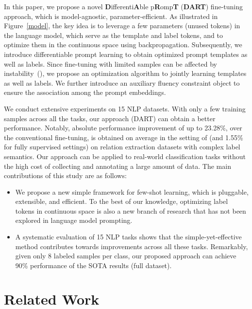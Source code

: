 \documentclass{article} \usepackage{iclr2022_conference,times}
\begin{document}
In this paper, we propose a novel \textbf{D}ifferenti\textbf{A}ble p\textbf{R}omp\textbf{T} (\textbf{DART}) fine-tuning approach, which is model-agnostic, parameter-efficient.
As illustrated in Figure~\ref{model}, the key idea is to leverage a few parameters (unused tokens) in the language model, which serve as the template and label tokens, and to optimize them in the continuous space using backpropagation. 
Subsequently, we introduce differentiable prompt learning to obtain optimized prompt templates as well as labels. 
Since fine-tuning with limited samples can be affected by instability~(\cite{DBLP:journals/corr/abs-2002-06305,zhang2021revisiting}), we propose an optimization algorithm to jointly learning templates as well as labels. 
We further introduce an auxiliary fluency constraint object to ensure the association among the prompt embeddings.

We conduct extensive experiments on 15 NLP datasets.
With only a few training samples across all the tasks, our approach (DART) can obtain a better performance. 
Notably, absolute performance improvement of up to 23.28\%, over the conventional fine-tuning, is obtained on average in the setting of  (and 1.55\% for fully supervised settings) on relation extraction datasets with complex label semantics.
Our approach can be applied to real-world classification tasks without the high cost of collecting and annotating a large amount of data. 
The main contributions of this study are as follows:

\begin{itemize}
    \item We propose a new simple framework for few-shot learning, which is pluggable, extensible, and efficient. 
    To the best of our knowledge, optimizing label tokens in continuous space is also a new branch of research that has not been explored in language model prompting.
    
    \item A systematic evaluation of 15 NLP tasks shows that the simple-yet-effective method contributes towards improvements across all these tasks.  
    Remarkably, given only 8 labeled samples per class, our proposed approach can achieve 90\% performance of the SOTA results (full dataset).
\end{itemize}

\section{Related Work}
\end{document}
